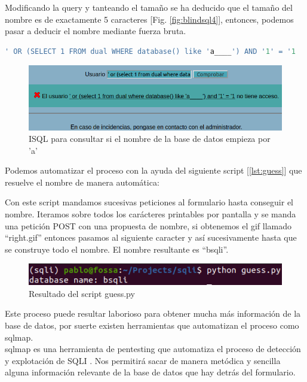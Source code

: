 \documentclass[a4paper,oneside]{article}
\begin{document}
Modificando la query y tanteando el tamaño se ha deducido que el tamaño del nombre es de exactamente 5 caracteres [Fig. \ref{fig:blindsql4}], entonces, podemos pasar a deducir el nombre mediante fuerza bruta.

\begin{lstlisting}[language=SQL, caption={ISQL para determinar si el nombre de la base de datos empieza por 'a'}]
' OR (SELECT 1 FROM dual WHERE database() like 'a____') AND '1' = '1
\end{lstlisting}

\begin{figure}[h!]
  \centering
  \includegraphics[scale=0.6]{images/blindsql5.png}
  \caption{ISQL para consultar si el nombre de la base de datos empieza por 'a'}
  \label{fig:blindsql5}
\end{figure}

Podemos automatizar el proceso con la ayuda del siguiente script [\ref{lst:guess}] que resuelve el nombre de manera automática:


Con este script mandamos sucesivas peticiones al formulario hasta conseguir el nombre. Iteramos sobre todos los carácteres printables por pantalla y se manda una petición POST con una propuesta de nombre, si obtenemos el gif llamado ``right.gif'' entonces pasamos al siguiente caracter y así sucesivamente hasta que se construye todo el nombre. El nombre resultante es ``bsqli''.

\begin{figure}[h!]
  \centering
  \includegraphics[scale=1]{images/blindsql6.png}
  \caption{Resultado del script guess.py}
  \label{fig:blindsql6}
\end{figure}

Este proceso puede resultar laborioso para obtener mucha más información de la base de datos, por suerte existen herramientas que automatizan el proceso como sqlmap.\\
sqlmap es una herramienta de pentesting que automatiza el proceso de detección y explotación de SQLI \cite{sqlmap}. Nos permitirá sacar de manera metódica y sencilla alguna información relevante de la base de datos que hay detrás del formulario.\\
\end{document}
